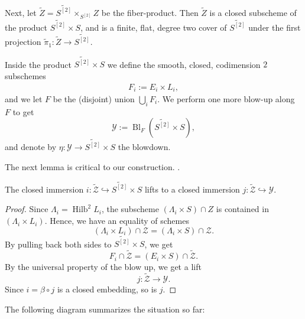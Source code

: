 \documentclass[12pt,reqno]{amsart}
\DeclareMathOperator{\id}{id}
\DeclareMathOperator{\Bl}{Bl}
\DeclareMathOperator{\Hilb}{Hilb}
\renewcommand{\to}{{\longrightarrow}}
\numberwithin{equation}{section}
\newcommand{\td}{\widetilde}
\begin{document}
Next, let $\widetilde{Z} = \widetilde{S^{[2]}} \times_{S^{[2]}} Z$
be the fiber-product.
Then $\widetilde{Z}$ is a closed subscheme of the
product $\widetilde{S^{[2]}} \times S$, and is a finite, flat, degree
two cover of $\widetilde{S^{[2]}}$ under the first projection
$\widetilde{\pi}_{1} : \widetilde{Z} \to \widetilde{S^{[2]}}.$

Inside the product $\widetilde{S^{[2]}} \times S$ we define the
smooth, closed, codimension $2$ subschemes
\begin{align}
  \label{eq:Fi}
  F_{i} := E_{i} \times L_{i},
\end{align}
and we let $F$ be the (disjoint) union $\bigcup_{i}F_{i}$.
We perform one more blow-up along $F$ to get
\begin{equation}
  \label{eq:Xtilde}
  \mathcal{Y} := \Bl_{F}\left( \widetilde{S^{[2]}} \times S \right),
\end{equation}
and denote by $\eta: \mathcal{Y} \to \widetilde{S^{[2]}} \times S $
the blowdown.

The next lemma is critical to our construction.
.
\begin{lemma}
  The closed immersion
  $i: \widetilde{\mathcal{Z}} \hookrightarrow \widetilde{S^{[2]}}
  \times S$ lifts to a closed immersion
  $j: \widetilde{\mathcal{Z}} \hookrightarrow  \mathcal{Y}$.
\end{lemma}
\begin{proof}
  Since $\Lambda_i = \Hilb^2 L_i$, the subscheme $(\Lambda_i \times S) \cap Z$ is contained in $(\Lambda_i \times L_i)$.
  Hence, we have an equality of schemes
  \[
    (\Lambda_i \times L_i) \cap \mathcal Z = (\Lambda_i \times S) \cap \mathcal Z.
  \]
  By pulling back both sides to $\widetilde{S^{[2]}} \times S$, we get
  \begin{equation}
    \label{eq:Cartier}
    F_i \cap \widetilde{\mathcal{Z}} = (E_i \times S) \cap \widetilde{\mathcal{Z}}.
  \end{equation}
  By the universal property of the blow up, we get a lift
  \[ j \colon \widetilde{\mathcal Z} \to \mathcal Y.\]
  Since $i = \beta \circ j$ is a closed embedding, so is $j$.
\end{proof}

The following diagram summarizes the situation so far:
\begin{center}
\end{center}
\end{document}
